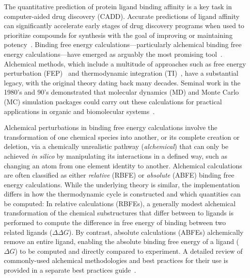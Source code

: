 \documentclass[9pt,bestpractices]{livecoms}
\begin{document}
The quantitative prediction of protein ligand binding affinity is a key task in computer-aided drug discovery (CADD). 
Accurate predictions of ligand affinity can significantly accelerate early stages of drug discovery programs when used to prioritize compounds for synthesis with the goal of improving or maintaining potency~\cite{abelCriticalReviewValidation2017,abelModelingValuePredictive2018}. 
Binding free energy calculations---particularly alchemical binding free energy calculations---have emerged as arguably the most promising tool~\cite{courniaRelativeBindingFree2017}. 
Alchemical methods, which include a multitude of approaches such as free energy perturbation (FEP)~\cite{zwanzigHighTemperatureEquation1954,bennettEfficientEstimationFree1976} and thermodynamic integration (TI)~\cite{kirkwoodQuantumStatisticsAlmost1933,kirkwoodQuantumStatisticsAlmost1934,kirkwoodStatisticalMechanicsFluid1935}, have a substantial legacy, with the original theory dating back many decades. 
Seminal work in the 1980’s and 90’s demonstrated that molecular dynamics (MD) and Monte Carlo (MC) simulation packages could carry out these calculations for practical applications in organic and biomolecular systems~\cite{jorgensenMonteCarloSimulation1985,straatsmaFreeEnergyHydrophobic1986,lybrandTheoreticalCalculationRelative1986,merzFreeEnergyPerturbation1989,pearlmanDeterminationDifferentialEffects1995,choderaAlchemicalFreeEnergy2011,mobleyPerspectiveAlchemicalFree2012}. 

Alchemical perturbations in binding free energy calculations involve the transformation of one chemical species into another, or its complete creation or deletion, via a chemically unrealistic pathway (\emph{alchemical}) that can only be achieved \textit{in silico} by manipulating its interactions in a defined way, such as changing an atom from one element identity to another.
Alchemical calculations are often classified as either \emph{relative} (RBFE) or \emph{absolute} (ABFE) binding free energy calculations. 
While the underlying theory is similar, the implementation differs in how the thermodynamic cycle is constructed and which quantities can be computed:
In relative calculations (RBFEs), a generally modest alchemical transformation of the chemical substructures that differ between to ligands is performed to compute the difference in free energy of binding between two related ligands ($\Delta \Delta G$).
By contrast, absolute calculations (ABFEs) alchemically remove an entire ligand, enabling the absolute binding free energy of a ligand ($\Delta G$) to be computed and directly compared to experiment.
A detailed review of commonly-used alchemical methodologies and best practices for their use is provided in a separate best practices guide~\cite{meyBestPracticesAlchemical2020}.
\end{document}
